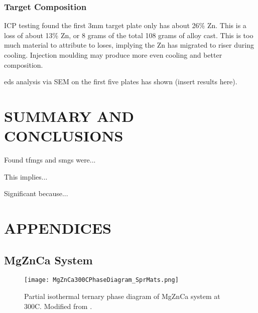 \documentclass[a4paper,12pt,oneside]{report}%
\begin{document}
\subsection{Target Composition}

ICP testing found the first 3mm target plate only has about 26\% Zn. This is a loss of about 13\% Zn, or 8 grams of the total 108 grams of alloy cast.  This is too much material to attribute to loses, implying the Zn has migrated to riser during cooling. Injection moulding may produce more even cooling and better composition. 

\Gls{eds} analysis via SEM on the first five plates has shown (insert results here). 

\chapter{SUMMARY AND CONCLUSIONS}
\glsresetall

Found \glspl{tfmg} and \glspl{smg} were...

This implies...

Significant because...








\chapter{APPENDICES}

\section{MgZnCa System}

\begin{figure}[htbp]
	\centering
	\texttt{[image: MgZnCa300CPhaseDiagram\_SprMats.png]}
	\caption[Partial isothermal ternary phase diagram of MgZnCa system at 300\degree C.]{Partial isothermal ternary phase diagram of MgZnCa system at 300\degree C. Modified from \cite{Melnik1978}.}
	\label{fig:MgZnCa300PhaseD}
\end{figure}
\end{document}
